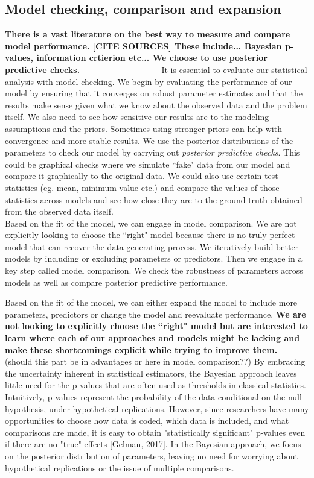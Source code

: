\documentclass{article}
\begin{document}
\subsection{Model checking, comparison and expansion}
\textbf{There is a vast literature on the best way to measure and compare model performance. [CITE SOURCES] These include... Bayesian p-values, information crtierion etc... We choose to use posterior predictive checks.}
---------------------------
It is essential to evaluate our statistical analysis with model checking. We begin by evaluating the performance of our model by ensuring that it converges on robust parameter estimates and that the results make sense given what we know about the observed data and the problem itself. We also need to see how sensitive our results are to the modeling assumptions and the priors. Sometimes using stronger priors can help with convergence and more stable results. We use the posterior distributions of the parameters to check our model by carrying out \textit{posterior predictive checks}. This could be graphical checks where we simulate ``fake" data from our model and compare it graphically to the original data. We could also use certain test statistics (eg. mean, minimum value etc.) and compare the values of those statistics across models and see how close they are to the ground truth obtained from the observed data itself.\\
Based on the fit of the model, we can engage in model comparison. We are not explicitly looking to choose the ``right" model because there is no truly perfect model that can recover the data generating process. We iteratively build better models by including or excluding parameters or predictors. Then we engage in a key step called model comparison. We check the robustness of parameters across models as well as compare posterior predictive performance.


 Based on the fit of the model, we can either expand the model to include more parameters, predictors or change the model and reevaluate performance. \textbf{We are not looking to explicitly choose the ``right" model but are interested to learn where each of our approaches and models might be lacking and make these shortcomings explicit while trying to improve them.}\\
(should this part be in advantages or here in model comparison??)
By embracing the uncertainty inherent in statistical estimators, the Bayesian approach leaves little need for the p-values that are often used as thresholds in classical statistics.  Intuitively, p-values represent the probability of the data conditional on the null hypothesis, under hypothetical replications.  However, since researchers have many opportunities to choose how data is coded, which data is included, and what comparisons are made, it is easy to obtain "statistically significant" p-values even if there are no "true" effects [Gelman, 2017].  In the Bayesian approach, we focus on the posterior distribution of parameters, leaving no need for worrying about hypothetical replications or the issue of multiple comparisons.
\end{document}
